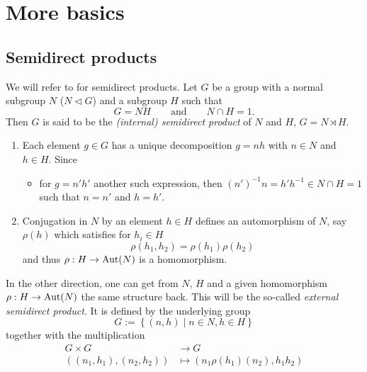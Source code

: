 \chapter{More basics}
\section{Semidirect products}
\begin{comment}
  see
  \begin{itemize}
    \item \url{http://nlab.mathforge.org/nlab/show/semidirect+product+group}
    \item \url{http://en.wikipedia.org/wiki/Semidirect_product}
    \item \cite{Robinson2003An}
  \end{itemize}
\end{comment}
We will refer to \cite[75]{Robinson2003An} for semidirect products.
Let $G$ be a group with a normal subgroup $N$ ($N\vartriangleleft G$) and a
subgroup $H$ such that 
\[
  G=NH\qquad\text{and}\qquad N\cap H=1.
\]
Then $G$ is said to be the \emph{(internal) semidirect product} of $N$ and $H$,
$G=N\rtimes H$.
\begin{rem}
  \begin{enumerate}
    \item Each element $g\in G$ has a unique decomposition $g=nh$ with $n\in N$
      and $h\in H$. Since
      \begin{itemize}
        \item[] for $g=n'h'$ another such expression, then
          $(n')^{-1}n=h'h^{-1}\in N\cap H=1$ such that $n=n'$ and $h=h'$.
      \end{itemize}
    \item Conjugation in $N$ by an element $h\in H$ defines an automorphism of
      $N$, say $\rho(h)$ which satisfies for $h_i\in H$
      \[
        \rho(h_1,h_2)=\rho(h_1)\rho(h_2)
      \]
      and thus $\rho:H\to\operatorname{Aut}(N)$ is a homomorphism.
  \end{enumerate}
\end{rem}
In the other direction, one can get from $N$, $H$ and a given homomorphism 
$\rho:H\to\operatorname{Aut}(N)$ the same structure back. This will be the so-called
\emph{external semidirect product}. It is defined by the underlying group
\[
  G:=\left\{(n,h)\mid n\in N,h\in H\right\}
\]
together with the multiplication
\begin{align*}
  G\times G&\to G
\\\left((n_1,h_1),(n_2,h_2)\right)&\mapsto(n_1\rho(h_1)(n_2),h_1h_2)
\end{align*}
